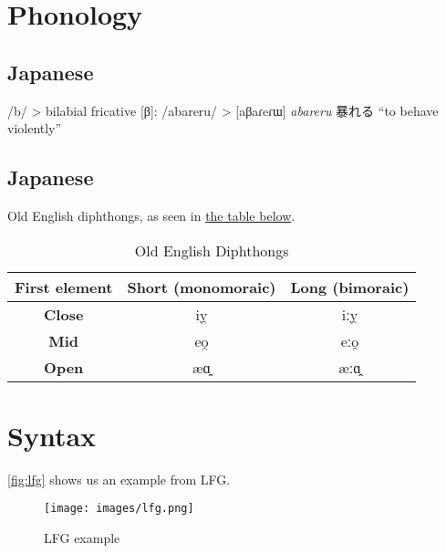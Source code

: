 \documentclass[a4paper,12pt,twoside]{article}
\begin{document}
\section{Phonology}\label{sec:phonology}
\subsection{Japanese}\label{ssec:phonology-japanese}

/b/ > bilabial fricative [β]: /abareru/ > [aβaɾeɾɯ] \textit{abareru} 暴れる ``to behave violently''


\subsection{Japanese}\label{ssec:phonology-oldenglish}


Old English diphthongs, as seen in \hyperref[tab:oe-diphthongs]{the table below}.

\begin{table}
  \caption{Old English Diphthongs}
  \label{tab:oe-diphthongs}

  \begin{tabular}{|c|c|c|}

    \hline
    \textbf{First element} & \textbf{Short (monomoraic)} & \textbf{Long (bimoraic)} \\
    \hline
    \textbf{Close} & iy̯ & iːy̯ \\
    \hline
    \textbf{Mid} & eo̯ & eːo̯ \\
    \hline
    \textbf{Open} & æɑ̯ & æːɑ̯ \\
    \hline

  \end{tabular}

\end{table}


\section{Syntax}\label{sec:syntax}

\autoref{fig:lfg} shows us an example from LFG.

\begin{figure}
  \caption{LFG example}
  \label{fig:lfg}
  \texttt{[image: images/lfg.png]}
\end{figure}
\end{document}
